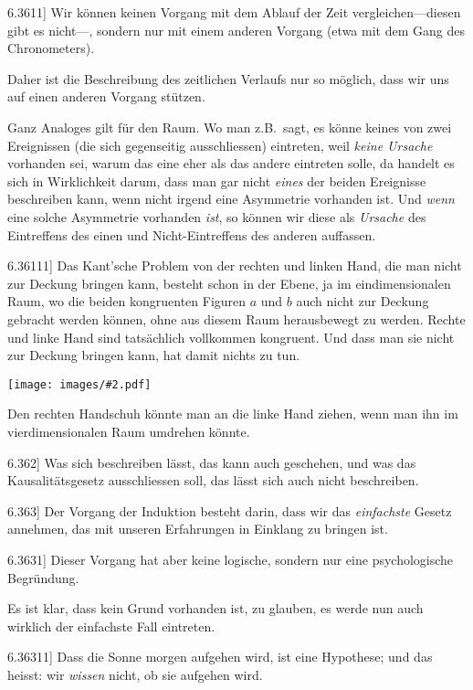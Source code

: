 \documentclass[12pt,oneside]{book}[2007/10/19]
\newcommand{\PropERef}[1]{\hyperref[PropE:#1]{#1}}
\newcommand{\PropositionG}[2]{%
  \item[\phantomsection\label{PropG:#1}\PropERef{#1}] #2%
}
\newcommand{\Illustration}[2][0.3\textwidth]{%
  \begin{center}
  \texttt{[image: images/\#2.pdf]}
  \end{center}
}
\newcommand{\Emph}[1]{\emph{#1}}%
\newcommand{\zumBeispiel}{z.\;B.}
\begin{document}
\begin{propositions}
\PropositionG{6.3611}
{Wir können keinen Vorgang mit dem \glqq{}Ablauf
der Zeit\grqq{} ver\-glei\-chen---diesen gibt es nicht---,
sondern nur mit einem anderen Vorgang (etwa
mit dem Gang des Chronometers).

Daher ist die Beschreibung des zeitlichen
Verlaufs nur so möglich, dass wir uns auf einen
anderen Vorgang stützen.

Ganz Analoges gilt für den Raum. Wo man
\zumBeispiel\ sagt, es könne keines von zwei Ereignissen
(die sich gegenseitig aus\-schlies\-sen) eintreten, weil
\Emph{keine Ursache} vorhanden sei, warum das eine
eher als das andere eintreten solle, da handelt es
sich in Wirklichkeit darum, dass man gar nicht
\Emph{eines} der beiden Ereignisse beschreiben kann,
wenn nicht irgend eine Asymmetrie vorhanden ist.
Und \Emph{wenn} eine solche Asymmetrie vorhanden \Emph{ist},
so können wir diese als \Emph{Ursache} des Eintreffens
des einen und Nicht-Eintreffens des anderen
auffassen.}


\PropositionG{6.36111}
{Das Kant'sche Problem von der rechten und
linken Hand, die man nicht zur Deckung bringen
kann, besteht schon in der Ebene, ja im eindimensionalen
Raum, wo die beiden kongruenten
Figuren $a$ und $b$ auch nicht zur Deckung gebracht
werden können, ohne aus diesem Raum
herausbewegt zu werden. Rechte und linke Hand
sind tatsächlich vollkommen kongruent. Und
dass man sie nicht zur Deckung bringen kann,
hat damit nichts zu tun.

\Illustration[0.45\textwidth]{space}

Den rechten Handschuh könnte man an die
linke Hand ziehen, wenn man ihn im vierdimensionalen
Raum umdrehen könnte.}


\PropositionG{6.362}
{Was sich beschreiben lässt, das kann auch
geschehen, und was das Kausalitätsgesetz ausschliessen
soll, das lässt sich auch nicht beschreiben.}


\PropositionG{6.363}
{Der Vorgang der Induktion besteht darin, dass
wir das \Emph{einfachste} Gesetz annehmen, das mit
unseren Erfahrungen in Einklang zu bringen ist.}


\PropositionG{6.3631}
{Dieser Vorgang hat aber keine logische, sondern
nur eine psychologische Begründung.

Es ist klar, dass kein Grund vorhanden ist, zu
glauben, es werde nun auch wirklich der einfachste
Fall eintreten.}


\PropositionG{6.36311}
{Dass die Sonne morgen aufgehen wird, ist eine
Hypothese; und das heisst: wir \Emph{wissen} nicht, ob
sie aufgehen wird.}



\end{propositions}
\end{document}

